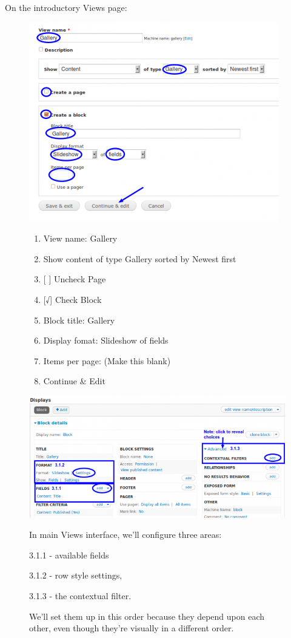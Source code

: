 \documentclass[letterpaper,10pt,english]{sphinxmanual}
\begin{document}
On the introductory Views page:
\begin{figure}[htbp]
\centering

\includegraphics[width=0.650\linewidth]{slideshow-3.1-412x328.png}
{\small \begin{enumerate}
\item {} 
View name: Gallery

\item {} 
Show content of type Gallery sorted by Newest first

\item {} 
{[} {]}    Uncheck Page

\item {} 
{[}√{]}  Check Block

\item {} 
Block title: Gallery

\item {} 
Display fomat: Slideshow of fields

\item {} 
Items per page: (Make this blank)

\item {} 
Continue \& Edit

\end{enumerate}
}\end{figure}
\begin{figure}[htbp]
\centering

\includegraphics[width=0.650\linewidth]{slideshow-3.1-main.png}
{\small 
In main Views interface, we'll configure three areas:

\begin{DUlineblock}{0em}
\item[] 3.1.1 - available fields
\item[] 3.1.2 - row style settings,
\item[] 3.1.3 - the contextual filter.
\end{DUlineblock}

We’ll set them up in this order because they depend upon each other, even though they’re visually in a different order.
}\end{figure}
\end{document}
